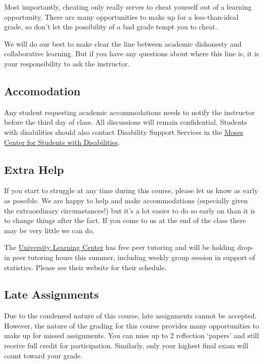 \documentclass[
]{book}
\begin{document}
Most importantly, cheating only really serves to cheat yourself out of a learning opportunity. There are many opportunities to make up for a less-than-ideal grade, so don't let the possibility of a bad grade tempt you to cheat.

We will do our best to make clear the line between academic dishonesty and collaborative learning. But if you have any questions about where this line is, it is your responsibility to ask the instructor.

\hypertarget{accomodation}{%
\subsection{Accomodation}\label{accomodation}}

Any student requesting academic accommodations needs to notify the instructor before the third day of class. All discussions will remain confidential. Students with disabilities should also contact Disability Support Services in the \href{https://www.nyu.edu/students/communities-and-groups/student-accessibility.html}{Moses Center for Students with Disabilities}.

\hypertarget{extra-help}{%
\subsection{Extra Help}\label{extra-help}}

If you start to struggle at any time during this course, please let us know as early as possible. We are happy to help and make accommodations (especially given the extraordinary circumstances!) but it's a lot easier to do so early on than it is to change things after the fact. If you come to us at the end of the class there may be very little we can do.

The \href{https://www.nyu.edu/students/academic-services/undergraduate-advisement/academic-resource-center/tutoring-and-learning.html}{University Learning Center} has free peer tutoring and will be holding drop-in peer tutoring hours this summer, including weekly group session in support of statistics. Please see their website for their schedule.

\hypertarget{late-assignments}{%
\subsection{Late Assignments}\label{late-assignments}}

Due to the condensed nature of this course, late assignments cannot be accepted. However, the nature of the grading for this course provides many opportunities to make up for missed assignments. You can miss up to 2 reflection `papers' and still receive full credit for participation. Similarly, only your highest final exam will count toward your grade.
\end{document}
